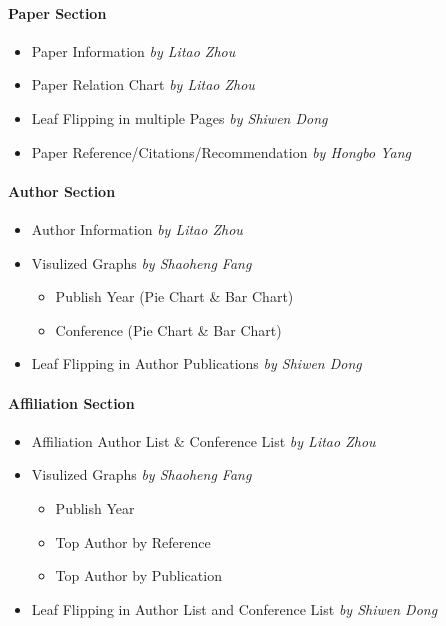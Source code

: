 \documentclass{book}
\begin{document}
\paragraph{Paper Section}
\begin{itemize}
\item Paper Information \textit{by Litao Zhou}
\item Paper Relation Chart \textit{by Litao Zhou}
\item Leaf Flipping in multiple Pages \textit{by Shiwen Dong}
\item Paper Reference/Citations/Recommendation  \textit{by Hongbo Yang}
\end{itemize}

\paragraph{Author Section}
\begin{itemize}
\item Author Information \textit{by Litao Zhou}
\item Visulized Graphs \textit{by Shaoheng Fang}
\begin{itemize}
	\item Publish Year (Pie Chart \& Bar Chart)
	\item Conference (Pie Chart \& Bar Chart)
\end{itemize}
\item Leaf Flipping in Author Publications \textit{by Shiwen Dong}
\end{itemize}

\paragraph{Affiliation Section}
\begin{itemize}
\item Affiliation Author List \& Conference List \textit{by Litao Zhou}
\item Visulized Graphs \textit{by Shaoheng Fang}
\begin{itemize}
	\item Publish Year
	\item Top Author by Reference
	\item Top Author by Publication
\end{itemize}
\item Leaf Flipping in Author List and Conference List \textit{by Shiwen Dong}
\end{itemize}
\end{document}
